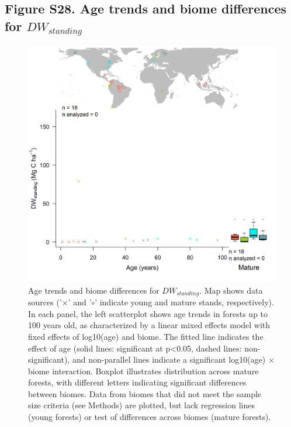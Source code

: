 \documentclass[
]{article}
\begin{document}
\newpage

\hypertarget{figure-s28.-age-trends-and-biome-differences-for-dw_standing}{%
\subsection{\texorpdfstring{Figure S28. Age trends and biome differences
for
\(DW_{standing}\)}{Figure S28. Age trends and biome differences for DW\_\{standing\}}}\label{figure-s28.-age-trends-and-biome-differences-for-dw_standing}}

\begin{figure}[H]

{\centering \includegraphics[width=1\linewidth]{tables_figures/age_trends/deadwood_standing_with_map} 

}

\caption{Age trends and biome differences for $DW_{standing}$. Map shows data sources ('$\times$' and '$\circ$' indicate young and mature stands, respectively). In each panel, the left scatterplot shows age trends in forests up to 100 years old, as characterized by a linear mixed effects model with fixed effects of log10(age) and biome. The fitted line indicates the effect of age (solid lines: significant at p<0.05, dashed lines: non-significant), and non-parallel lines indicate a significant log10(age) $\times$ biome interaction. Boxplot illustrates distribution across mature forests, with different letters indicating significant differences between biomes. Data from biomes that did not meet the sample size criteria (see Methods) are plotted, but lack regression lines (young forests) or test of differences across biomes (mature forests).}\label{fig:unnamed-chunk-31}
\end{figure}
\end{document}
